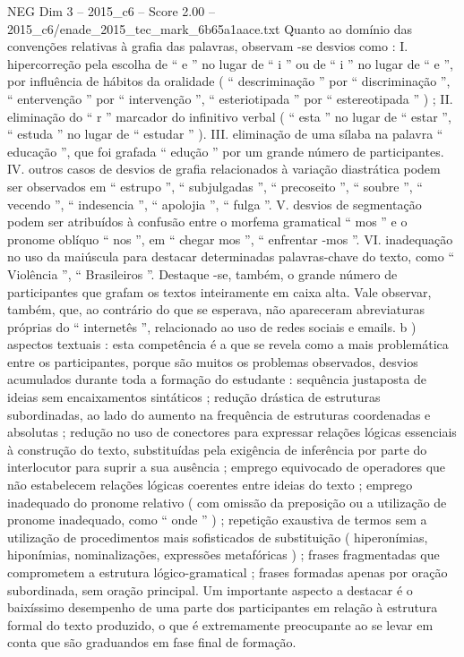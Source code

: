 \begin{textsample}{NEG Dim 3 – 2015\_c6 – Score 2.00 – 2015\_c6/enade\_2015\_tec\_mark\_6b65a1aace.txt}
Quanto ao domínio das convenções relativas à grafia das palavras, observam -se desvios como : I. hipercorreção pela escolha de “ e ” no lugar de “ i ” ou de “ i ” no lugar de “ e ”, por influência de hábitos da oralidade ( “ descriminação ” por “ discriminação ”, “ entervenção ” por “ intervenção ”, “ esteriotipada ” por “ estereotipada ” ) ; II. eliminação do “ r ” marcador do infinitivo verbal ( “ esta ” no lugar de “ estar ”, “ estuda ” no lugar de “ estudar ” ).
III. eliminação de uma sílaba na palavra “ educação ”, que foi grafada “ edução ” por um grande número de participantes.
IV. outros casos de desvios de grafia relacionados à variação diastrática podem ser observados em “ estrupo ”, “ subjulgadas ”, “ precoseito ”, “ soubre ”, “ vecendo ”, “ indesencia ”, “ apolojia ”, “ fulga ”.
V. desvios de segmentação podem ser atribuídos à confusão entre o morfema gramatical “ mos ” e o pronome oblíquo “ nos ”, em “ chegar mos ”, “ enfrentar -mos ”.
VI. inadequação no uso da maiúscula para destacar determinadas palavras-chave do texto, como “ Violência ”, “ Brasileiros ”.
Destaque -se, também, o grande número de participantes que grafam os textos inteiramente em caixa alta.
Vale observar, também, que, ao contrário do que se esperava, não apareceram abreviaturas próprias do “ internetês ”, relacionado ao uso de redes sociais e emails. b ) aspectos textuais : esta competência é a que se revela como a mais problemática entre os participantes, porque são muitos os problemas observados, desvios acumulados durante toda a formação do estudante : sequência justaposta de ideias sem encaixamentos sintáticos ; redução drástica de estruturas subordinadas, ao lado do aumento na frequência de estruturas coordenadas e absolutas ; redução no uso de conectores para expressar relações lógicas essenciais à construção do texto, substituídas pela exigência de inferência por parte do interlocutor para suprir a sua ausência ; emprego equivocado de operadores que não estabelecem relações lógicas coerentes entre ideias do texto ; emprego inadequado do pronome relativo ( com omissão da preposição ou a utilização de pronome inadequado, como “ onde ” ) ; repetição exaustiva de termos sem a utilização de procedimentos mais sofisticados de substituição ( hiperonímias, hiponímias, nominalizações, expressões metafóricas ) ; frases fragmentadas que comprometem a estrutura lógico-gramatical ; frases formadas apenas por oração subordinada, sem oração principal.
Um importante aspecto a destacar é o baixíssimo desempenho de uma parte dos participantes em relação à estrutura formal do texto produzido, o que é extremamente preocupante ao se levar em conta que são graduandos em fase final de formação.

\end{textsample}
